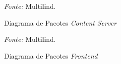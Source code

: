 \begin{figure}[h!]
	\centering
	\caption{Diagrama de Pacotes \textit{Content Server}}
	\begin{tablenotes}[flushleft]
		\centering
		\item \textit{Fonte:} Multilind.
	\end{tablenotes}
	\label{fig08}
\end{figure}
\begin{figure}[h!]
	\centering
	\caption{Diagrama de Pacotes \textit{Frontend}}
	\begin{tablenotes}[flushleft]
		\centering
		\item \textit{Fonte:} Multilind.
	\end{tablenotes}
	\label{fig09}
\end{figure}


